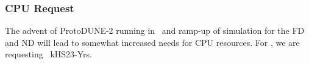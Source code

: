 \documentclass[12pt]{article}
\newcommand{\hrefII}[1]{\href{#1}{#1}}
\begin{document}
%
%

\subsubsection{CPU Request}\label{sec:cpuresult} The advent of ProtoDUNE-2 running in \ThisYear\ and ramp-up of simulation for the FD and ND will lead to somewhat increased needs for CPU resources.  For \ThisYear, we are requesting \CPUTotal\   kHS23-Yrs.
%



\clearpage
\appendix
\end{document}
